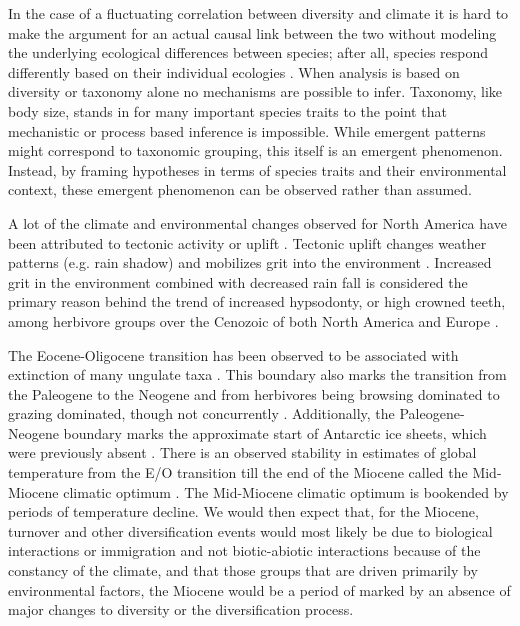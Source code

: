 \documentclass[12pt,letterpaper]{article}
\begin{document}
In the case of a fluctuating correlation between diversity and climate it is hard to make the argument for an actual causal link between the two without modeling the underlying ecological differences between species; after all, species respond differently based on their individual ecologies \citep{Blois2009}. When analysis is based on diversity or taxonomy alone no mechanisms are possible to infer. Taxonomy, like body size, stands in for many important species traits to the point that mechanistic or process based inference is impossible. While emergent patterns might correspond to taxonomic grouping, this itself is an emergent phenomenon. Instead, by framing hypotheses in terms of species traits and their environmental context, these emergent phenomenon can be observed rather than assumed.


A lot of the climate and environmental changes observed for North America have been attributed to tectonic activity or uplift \citep{Blois2009,Eronen2015,Janis2008a,Badgley2013}. Tectonic uplift changes weather patterns (e.g. rain shadow) and mobilizes grit into the environment \citep{Jardine2012}. Increased grit in the environment combined with decreased rain fall is considered the primary reason behind the trend of increased hypsodonty, or high crowned teeth, among herbivore groups over the Cenozoic of both North America and Europe \citep{Jernvall2002,Jardine2012,Damuth2011}.

The Eocene-Oligocene transition has been observed to be associated with extinction of many ungulate taxa \citep{Janis2008a}. This boundary also marks the transition from the Paleogene to the Neogene and from herbivores being browsing dominated to grazing dominated, though not concurrently \citep{Janis1993b,Stromberg2005}. Additionally, the Paleogene-Neogene boundary marks the approximate start of Antarctic ice sheets, which were previously absent \citep{Zachos2008}. There is an observed stability in estimates of global temperature from the E/O transition till the end of the Miocene called the Mid-Miocene climatic optimum \citep{Zachos2001,Zachos2008}. The Mid-Miocene climatic optimum is bookended by periods of temperature decline. We would then expect that, for the Miocene, turnover and other diversification events would most likely be due to biological interactions or immigration and not biotic-abiotic interactions because of the constancy of the climate, and that those groups that are driven primarily by environmental factors, the Miocene would be a period of marked by an absence of major changes to diversity or the diversification process.
\end{document}
